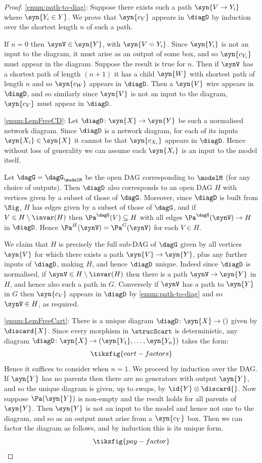 \documentclass{article}
\begin{document}
{\begin{proof}
\eqref{enum:path-to-diag}: Suppose there exists such a path $\syn{V \to Y_i}$ where $\syn{Y_i \in Y}$. We prove that $\syn{c_V}$ appears in $\diagD$ by induction over the shortest length $n$ of such a path. 

If $n=0$ then $\synV \in \syn{Y}$, with $\syn{V = Y_i}$. Since $\syn{Y_i}$ is not an input to the diagram, it must arise as an output of some box, and so $\syn{c_{Y_i}}$ must appear in the diagram. Suppose the result is true for $n$. Then if $\synV$ has a shortest path of length $(n + 1)$ it has a child $\syn{W}$ with shortest path of length $n$ and so $\syn{c_W}$ appears in $\diagD$. Then a $\syn{V}$ wire appears in $\diagD$, and so similarly since $\syn{V}$ is not an input to the diagram, $\syn{c_V}$ must appear in $\diagD$.

\eqref{enum:LemFreeCD}:
Let $\diagD \colon \syn{X} \to \syn{Y}$ be such a normalised network diagram. Since $\diagD$ is a network diagram, for each of its inputs $\syn{X_i} \in \syn{X}$ it cannot be that $\syn{c_{X_i}}$ appears in $\diagD$. Hence without loss of generality we can assume each $\syn{X_i}$ is an input to the model itself. 

Let $\dagG=\dagG_\modelM$ be the open DAG corresponding to $\modelM$ (for any choice of outputs). Then $\diagD$ also corresponds to an open DAG $H$ with vertices given by a subset of those of $\dagG$. Moreover, since $\diagD$ is built from $\Sig$, $H$ has edges given by a subset of those of $\dagG$, and if $V \in H \setminus \invar(H)$ then $\Pa^\dagG(V) \subseteq H$ with all edges $\Pa^\dagG(\synV) \to H$ in $\diagD$. Hence $\Pa^H(\synV) = \Pa^G(\synV)$ for each $V \in H$. 

We claim that $H$ is precisely the full sub-DAG of $\dagG$ given by all vertices $\syn{V}$ for which there exists a path $\syn{V} \to \syn{Y}$, plus any further inputs of $\diagD$, making $H$, and hence $\diagD$ unique. Indeed since $\diagD$ is normalised, if $\synV \in H \setminus \invar(H)$ then there is a path $\synV \to \syn{Y}$ in $H$, and hence also such a path in $G$. Conversely if $\synV$ has a path to $\syn{Y}$ in $G$ then $\syn{c_V}$ appears in $\diagD$ by \eqref{enum:path-to-diag} and so $\synV \in H$, as required.

\eqref{enum:LemFreeCart}: 
There is a unique diagram $\diagD \colon \syn{X} \to ( )$ given by $\discard{X}$. Since every morphism in $\strucScart$ is deterministic, any diagram $\diagD \colon \syn{X} \to (\syn{Y_1},\dots,\syn{Y_n})$ takes the form:
\[
\tikzfig{cart-factors}
\]
Hence it suffices to consider when $n=1$. We proceed by induction over the DAG. If $\syn{Y}$ has no parents then there are no generators with output $\syn{Y}$, and so the unique diagram is given, up to swaps, by $\id{Y} \otimes \discard{}$. Now suppose $\Pa(\syn{Y})$ is non-empty and the result holds for all parents of $\syn{Y}$. Then $\syn{Y}$ is not an input to the model and hence not one to the diagram, and so as an output must arise from a $\syn{c_Y}$ box. Then we can factor the diagram as follows, and by induction this is its unique form. 
\[
\tikzfig{pay-factor}
\]
\end{proof}


}
\end{document}
